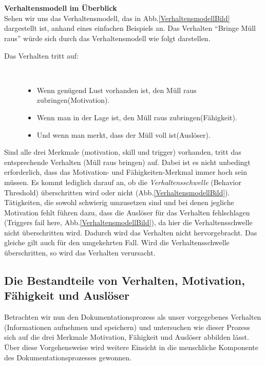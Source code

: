 \documentclass[a4paper,12pt,twoside]{scrartcl}
\begin{document}
\\\\
\textbf{Verhaltensmodell im Überblick}\\
Sehen wir uns das Verhaltensmodell, das in Abb.\ref{VerhaltensmodellBild} dargestellt ist, anhand eines einfachen Beispiels an. Das Verhalten \enquote{Bringe Müll raus} würde sich durch das Verhaltensmodell wie folgt darstellen. 
\begin{description}
   \item[Das Verhalten tritt auf:]~\par
   \begin{itemize}
      \item Wenn genügend Lust vorhanden ist, den Müll raus zubringen(Motivation).
      \item Wenn man in der Lage ist, den Müll raus zubringen(Fähigkeit).
      \item Und wenn man merkt, dass der Müll voll ist(Auslöser).
   \end{itemize}
\end{description}  
Sind alle drei Merkmale (motivation, skill und trigger) vorhanden, tritt das entsprechende Verhalten (Müll raus bringen) auf. Dabei ist es nicht unbedingt erforderlich, dass das Motivation- und Fähigkeiten-Merkmal immer hoch sein müssen. Es kommt lediglich darauf an, ob die \textit{Verhaltensschwelle} (Behavior Threshold) überschritten wird oder nicht (Abb.\ref{VerhaltensmodellBild}). Tätigkeiten, die sowohl schwierig umzusetzen sind und bei denen jegliche Motivation fehlt führen dazu, dass die Auslöser für das Verhalten fehlschlagen (Triggers fail here, Abb.\ref{VerhaltensmodellBild}), da hier die Verhaltensschwelle nicht überschritten wird. Dadurch wird das Verhalten nicht hervorgebracht. Das gleiche gilt auch für den umgekehrten Fall. Wird die Verhaltensschwelle überschritten, so wird das Verhalten verursacht.

\subsection{Die Bestandteile von Verhalten, Motivation, Fähigkeit und Auslöser}
\label{Die Bestandteile von Verhalten, Motivation, Fähigkeit und Auslöser}
Betrachten wir nun den Dokumentationsprozess als unser vorgegebenes Verhalten (Informationen aufnehmen und speichern) und untersuchen wie dieser Prozess sich auf die drei Merkmale Motivation, Fähigkeit und Auslöser abbilden lässt. Über diese Vorgehensweise wird weitere Einsicht in die menschliche Komponente des Dokumentationsprozesses gewonnen.
\end{document}

